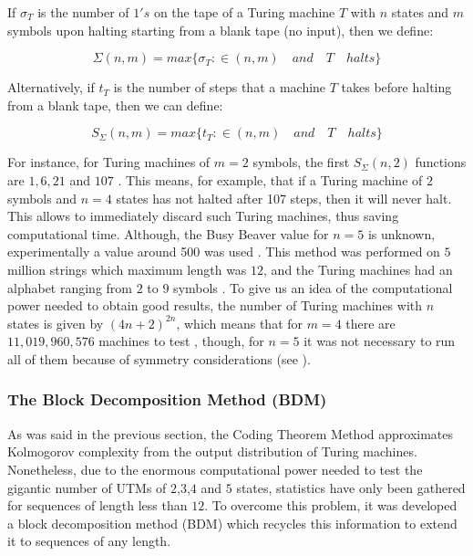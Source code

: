 \begin{defn}
If $\sigma_{T}$ is the number of $1's$ on the tape of a Turing machine $T$ with $n$ states and $m$ symbols upon halting starting from a blank tape (no input), then we define:

\begin{equation}
\Sigma(n,m) =max\{ \sigma_{T}: \in (n,m) \quad and \quad T \quad halts \}
\end{equation}

Alternatively, if $t_{T}$ is the number of steps that a machine $T$ takes before halting from a blank tape, then we can define:

\begin{equation}
S_{\Sigma}(n,m) =max\{ t_{T}: \in (n,m) \quad and \quad T \quad halts \}
\end{equation}

\end{defn}

For instance, for Turing machines of $m=2$ symbols, the first $S_{\Sigma}(n,2)$ functions are $1,6,21$ and $107$ \cite{busy}. This means, for example, that if a Turing machine of $2$ symbols and $n=4$ states has not halted after 107 steps, then it will never halt. This allows to immediately discard such Turing machines, thus saving computational time. Although, the Busy Beaver value for $n=5$ is unknown, experimentally a value around 500 was used \cite{kolmo_calculating}. This method was performed on $5$ million strings which maximum length was $12$, and the Turing machines had an alphabet ranging from $2$ to $9$ symbols \cite{decomposition}. To give us an idea of the computational power needed to obtain good results, the number of Turing machines with $n$ states is given by $(4n+2)^{2n}$, which means that for $m=4$ there are $11,019,960,576$ machines to test \cite{kolmo_calculating}, though, for $n=5$ it was not necessary to run all of them because of symmetry considerations (see \cite{kolmo_calculating}).

\subsubsection{The Block Decomposition Method (BDM)}
\label{BDM_section}
As was said in the previous section, the Coding Theorem Method approximates Kolmogorov complexity from the output distribution of Turing machines. Nonetheless, due to the enormous computational power needed to test the gigantic number of UTMs of $2$,$3$,$4$ and $5$ states, statistics have only been gathered for sequences of length less than $12$. To overcome this problem, it was developed a block decomposition method (BDM) which recycles this information to extend it to sequences of any length. 

